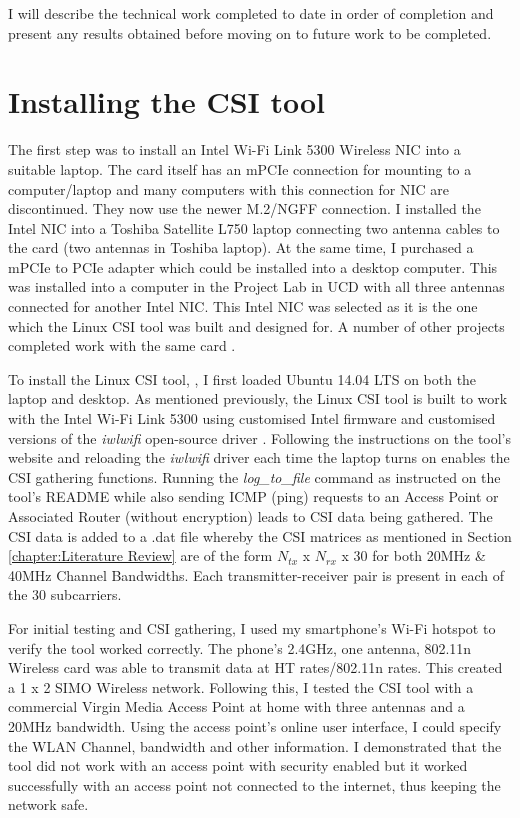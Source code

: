 I will describe the technical work completed to date in order of completion and present any results obtained before moving on to future work to be completed. 
\section{Installing the CSI tool}
The first step was to install an Intel Wi-Fi Link 5300 Wireless NIC into a suitable laptop. The card itself has an mPCIe connection for mounting to a computer/laptop and many computers with this connection for NIC are discontinued. They now use the newer M.2/NGFF connection. I installed the Intel NIC into a Toshiba Satellite L750 laptop connecting two antenna cables to the card (two antennas in Toshiba laptop). At the same time, I purchased a mPCIe to PCIe adapter which could be installed into a desktop computer. This was installed into a computer in the Project Lab in UCD with all three antennas connected for another Intel NIC. This Intel NIC was selected as it is the one which the Linux CSI tool was built and designed for. A number of other projects completed work with the same card \citep{Halperin_csitool}. \par
To install the Linux CSI tool, \cite{Halperin_csitool}, I first loaded Ubuntu 14.04 LTS on both the laptop and desktop. As mentioned previously, the Linux CSI tool is built to work with the Intel Wi-Fi Link 5300 using customised Intel firmware and customised versions of the \textit{iwlwifi} open-source driver \citep{Halperin_csitool}. Following the instructions on the tool's website and reloading the \textit{iwlwifi} driver each time the laptop turns on enables the CSI gathering functions. Running the \textit{log\_to\_file} command as instructed on the tool's README while also sending ICMP (ping) requests to an Access Point or Associated Router (without encryption) leads to CSI data being gathered. The CSI data is added to a .dat file whereby the CSI matrices as mentioned in Section \ref{chapter:Literature Review} are of the form $N_{tx}$ x $N_{rx}$ x 30 for both 20MHz \& 40MHz Channel Bandwidths. Each transmitter-receiver pair is present in each of the 30 subcarriers. \par
For initial testing and CSI gathering, I used my smartphone's Wi-Fi hotspot to verify the tool worked correctly. The phone's 2.4GHz, one antenna, 802.11n Wireless card was able to transmit data at HT rates/802.11n rates. This created a 1 x 2 SIMO Wireless network. Following this, I tested the CSI tool with a commercial Virgin Media Access Point at home with three antennas and a 20MHz bandwidth. Using the access point's online user interface, I could specify the WLAN Channel, bandwidth and other information. I demonstrated that the tool did not work with an access point with security enabled but it worked successfully with an access point not connected to the internet, thus keeping the network safe. \par 
